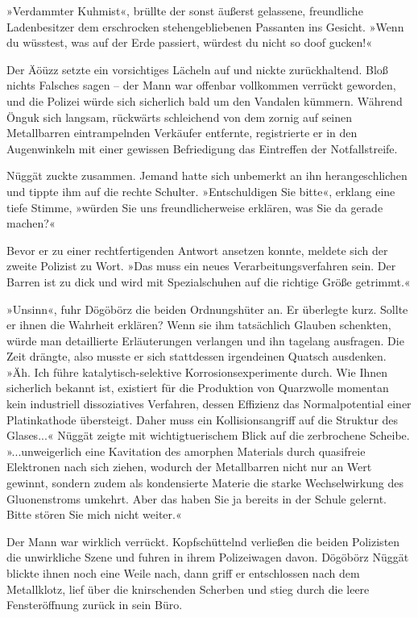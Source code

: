 »Verdammter Kuhmist«, brüllte der sonst äußerst gelassene, freundliche Ladenbesitzer dem erschrocken stehengebliebenen Passanten ins Gesicht. »Wenn du wüsstest, was auf der Erde passiert, würdest du nicht so doof gucken!«

Der Äöüzz setzte ein vorsichtiges Lächeln auf und nickte zurückhaltend. Bloß nichts Falsches sagen – der Mann war offenbar vollkommen verrückt geworden, und die Polizei würde sich sicherlich bald um den Vandalen kümmern. Während Önguk sich langsam, rückwärts schleichend von dem zornig auf seinen Metallbarren eintrampelnden Verkäufer entfernte, registrierte er in den Augenwinkeln mit einer gewissen Befriedigung das Eintreffen der Notfallstreife.

Nüggät zuckte zusammen. Jemand hatte sich unbemerkt an ihn herangeschlichen und tippte ihm auf die rechte Schulter. »Entschuldigen Sie bitte«, erklang eine tiefe Stimme, »würden Sie uns freundlicherweise erklären, was Sie da gerade machen?«

Bevor er zu einer rechtfertigenden Antwort ansetzen konnte, meldete sich der zweite Polizist zu Wort. »Das muss ein neues Verarbeitungsverfahren sein. Der Barren ist zu dick und wird mit Spezialschuhen auf die richtige Größe getrimmt.«

»Unsinn«, fuhr Dögöbörz die beiden Ordnungshüter an. Er überlegte kurz. Sollte er ihnen die Wahrheit erklären? Wenn sie ihm tatsächlich Glauben schenkten, würde man detaillierte Erläuterungen verlangen und ihn tagelang ausfragen. Die Zeit drängte, also musste er sich stattdessen irgendeinen Quatsch ausdenken. »Äh. Ich führe katalytisch-selektive Korrosionsexperimente durch. Wie Ihnen sicherlich bekannt ist, existiert für die Produktion von Quarzwolle momentan kein industriell dissoziatives Verfahren, dessen Effizienz das Normalpotential einer Platinkathode übersteigt. Daher muss ein Kollisionsangriff auf die Struktur des Glases...« Nüggät zeigte mit wichtigtuerischem Blick auf die zerbrochene Scheibe. »...unweigerlich eine Kavitation des amorphen Materials durch quasifreie Elektronen nach sich ziehen, wodurch der Metallbarren nicht nur an Wert gewinnt, sondern zudem als kondensierte Materie die starke Wechselwirkung des Gluonenstroms umkehrt. Aber das haben Sie ja bereits in der Schule gelernt.  Bitte stören Sie mich nicht weiter.«

Der Mann war wirklich verrückt. Kopfschüttelnd verließen die beiden Polizisten die unwirkliche Szene und fuhren in ihrem Polizeiwagen davon. Dögöbörz Nüggät blickte ihnen noch eine Weile nach, dann griff er entschlossen nach dem Metallklotz, lief über die knirschenden Scherben und stieg durch die leere Fensteröffnung zurück in sein Büro.

